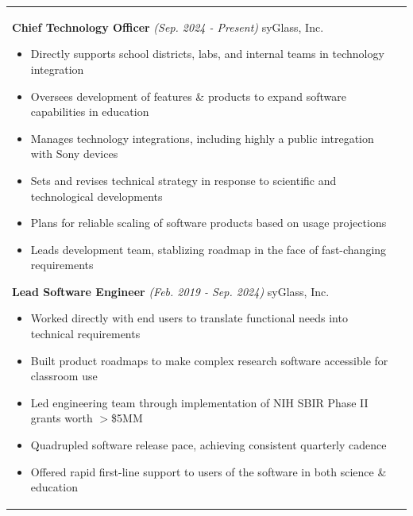\documentclass{article}
\begin{document}
\begin{tabular}{@{}p{2.5cm}@{\hspace{0.2cm}}p{13cm}@{}}
\textbf{Chief Technology Officer}
\hfill\small\textit{(Sep. 2024 - Present)}\normalsize
\newline syGlass, Inc.
\par\vspace{0.15cm}\small
\begin{itemize}[leftmargin=*,nolistsep,noitemsep]
  \item[--]Directly supports school districts, labs, and internal teams in technology integration
  \item[--]Oversees development of features \& products to expand software capabilities in education
  \item[--]Manages technology integrations, including highly a public intregation with Sony devices
  \item[--]Sets and revises technical strategy in response to scientific and technological developments
  \item[--]Plans for reliable scaling of software products based on usage projections
  \item[--]Leads development team, stablizing roadmap in the face of fast-changing requirements
\newline
\end{itemize}
\normalsize

\textbf{Lead Software Engineer}
\hfill\small\textit{(Feb. 2019 - Sep. 2024)}\normalsize
\newline syGlass, Inc.
\par\vspace{0.15cm}\small
\begin{itemize}[leftmargin=*,nolistsep,noitemsep]
  \item[--]Worked directly with end users to translate functional needs into technical requirements
  \item[--]Built product roadmaps to make complex research software accessible for classroom use
  \item[--]Led engineering team through implementation of NIH SBIR Phase II grants worth $>$\$5MM
  \item[--]Quadrupled software release pace, achieving consistent quarterly cadence
  \item[--]Offered rapid first-line support to users of the software in both science \& education
\newline
\end{itemize}
\normalsize


\end{tabular}
\end{document}
